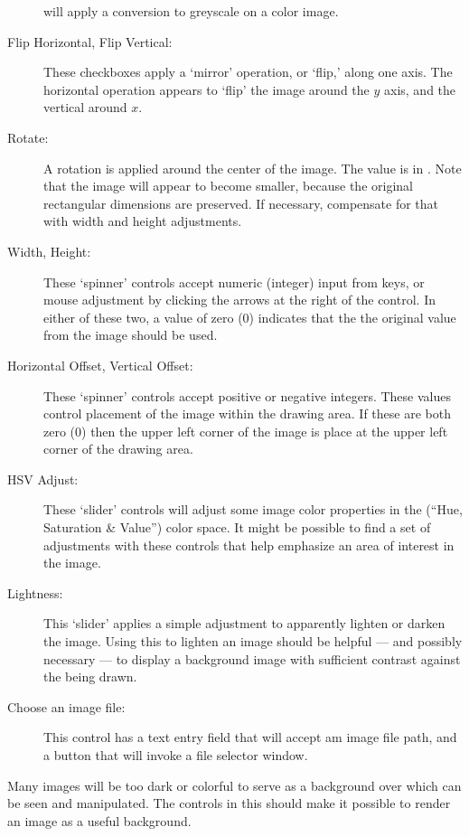 \begin{description}
		  will apply a conversion to greyscale on a color
		  image.
		  \item[Flip Horizontal, Flip Vertical:] These checkboxes
		  apply a `mirror' operation, or `flip,' along one
		  axis. The horizontal operation appears to `flip'
		  the image around the $y$ axis,
		  and the vertical around $x$.
		  \item[Rotate:] A rotation is applied around the
		  center of the image. The value is in .
		  Note that the image will appear to become smaller,
		  because the original rectangular dimensions
		  are preserved. If necessary, compensate for that
		  with width and height adjustments.
		  \item[Width, Height:] These `spinner' controls accept
		  numeric (integer) input from keys, or mouse adjustment
		  by clicking the arrows at the right of the control.
		  In either of these two, a value of zero (0)
		  indicates that the the original value from the image
		  should be used.
		  \item[Horizontal Offset, Vertical Offset:] These
		  `spinner' controls accept positive or negative
		  integers. These values control placement of the image
		  within the drawing area. If these are both
		  zero (0) then the upper left corner of the image
		  is place at the upper left corner of the drawing
		  area.
		  \item[HSV Adjust:] These `slider' controls will
		  adjust some image color properties in the
		  (``Hue, Saturation \& Value'') color space.
		  It might be possible to find a set of adjustments
		  with these controls that help emphasize an area
		  of interest in the image.
		  \item[Lightness:] This `slider' applies a simple
		  adjustment to apparently lighten or darken the
		  image. Using this to lighten an image should be
		  helpful --- and possibly necessary --- to display
		  a background image with sufficient contrast
		  against the  being drawn.
		  \item[Choose an image file:] This control has a
		  text entry field that will accept am image
		  file path, and a button that will invoke a
		  file selector  window.
		\end{description}

		Many images will be too dark or colorful to serve
		as a background over which  can be
		seen and manipulated. The controls in this 
		should make it possible to render an image as a
		useful background.
